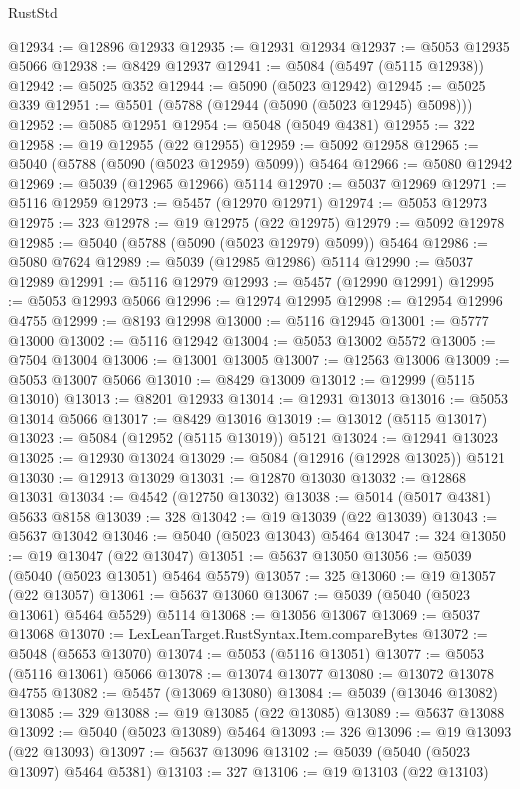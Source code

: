\begin{lexlean}{RustStd}
\begin{coremodule}
@12934 := @12896 @12933
@12935 := @12931 @12934
@12937 := @5053 @12935 @5066
@12938 := @8429 @12937
@12941 := @5084 (@5497 (@5115 @12938))
@12942 := @5025 @352
@12944 := @5090 (@5023 @12942)
@12945 := @5025 @339
@12951 := @5501 (@5788 (@12944 (@5090 (@5023 @12945) @5098)))
@12952 := @5085 @12951
@12954 := @5048 (@5049 @4381)
@12955 := 322
@12958 := @19 @12955 (@22 @12955)
@12959 := @5092 @12958
@12965 := @5040 (@5788 (@5090 (@5023 @12959) @5099)) @5464
@12966 := @5080 @12942
@12969 := @5039 (@12965 @12966) @5114
@12970 := @5037 @12969
@12971 := @5116 @12959
@12973 := @5457 (@12970 @12971)
@12974 := @5053 @12973
@12975 := 323
@12978 := @19 @12975 (@22 @12975)
@12979 := @5092 @12978
@12985 := @5040 (@5788 (@5090 (@5023 @12979) @5099)) @5464
@12986 := @5080 @7624
@12989 := @5039 (@12985 @12986) @5114
@12990 := @5037 @12989
@12991 := @5116 @12979
@12993 := @5457 (@12990 @12991)
@12995 := @5053 @12993 @5066
@12996 := @12974 @12995
@12998 := @12954 @12996 @4755
@12999 := @8193 @12998
@13000 := @5116 @12945
@13001 := @5777 @13000
@13002 := @5116 @12942
@13004 := @5053 @13002 @5572
@13005 := @7504 @13004
@13006 := @13001 @13005
@13007 := @12563 @13006
@13009 := @5053 @13007 @5066
@13010 := @8429 @13009
@13012 := @12999 (@5115 @13010)
@13013 := @8201 @12933
@13014 := @12931 @13013
@13016 := @5053 @13014 @5066
@13017 := @8429 @13016
@13019 := @13012 (@5115 @13017)
@13023 := @5084 (@12952 (@5115 @13019)) @5121
@13024 := @12941 @13023
@13025 := @12930 @13024
@13029 := @5084 (@12916 (@12928 @13025)) @5121
@13030 := @12913 @13029
@13031 := @12870 @13030
@13032 := @12868 @13031
@13034 := @4542 (@12750 @13032)
@13038 := @5014 (@5017 @4381) @5633 @8158
@13039 := 328
@13042 := @19 @13039 (@22 @13039)
@13043 := @5637 @13042
@13046 := @5040 (@5023 @13043) @5464
@13047 := 324
@13050 := @19 @13047 (@22 @13047)
@13051 := @5637 @13050
@13056 := @5039 (@5040 (@5023 @13051) @5464 @5579)
@13057 := 325
@13060 := @19 @13057 (@22 @13057)
@13061 := @5637 @13060
@13067 := @5039 (@5040 (@5023 @13061) @5464 @5529) @5114
@13068 := @13056 @13067
@13069 := @5037 @13068
@13070 := LexLeanTarget.RustSyntax.Item.compareBytes
@13072 := @5048 (@5653 @13070)
@13074 := @5053 (@5116 @13051)
@13077 := @5053 (@5116 @13061) @5066
@13078 := @13074 @13077
@13080 := @13072 @13078 @4755
@13082 := @5457 (@13069 @13080)
@13084 := @5039 (@13046 @13082)
@13085 := 329
@13088 := @19 @13085 (@22 @13085)
@13089 := @5637 @13088
@13092 := @5040 (@5023 @13089) @5464
@13093 := 326
@13096 := @19 @13093 (@22 @13093)
@13097 := @5637 @13096
@13102 := @5039 (@5040 (@5023 @13097) @5464 @5381)
@13103 := 327
@13106 := @19 @13103 (@22 @13103)

\end{coremodule}
\end{lexlean}

